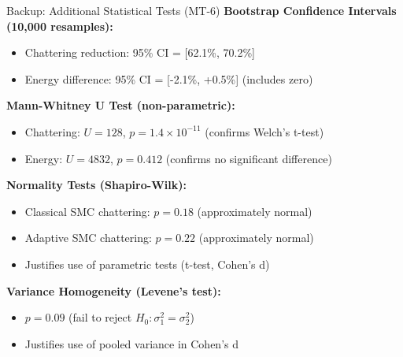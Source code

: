 \documentclass[10pt,aspectratio=169]{beamer}
\begin{document}
\begin{frame}{Backup: Additional Statistical Tests (MT-6)}
\textbf{Bootstrap Confidence Intervals (10,000 resamples):}
\begin{itemize}
    \item Chattering reduction: 95\% CI = [62.1\%, 70.2\%]
    \item Energy difference: 95\% CI = [-2.1\%, +0.5\%] (includes zero)
\end{itemize}

\vspace{0.3cm}
\textbf{Mann-Whitney U Test (non-parametric):}
\begin{itemize}
    \item Chattering: $U = 128$, $p = 1.4 \times 10^{-11}$ (confirms Welch's t-test)
    \item Energy: $U = 4832$, $p = 0.412$ (confirms no significant difference)
\end{itemize}

\vspace{0.3cm}
\textbf{Normality Tests (Shapiro-Wilk):}
\begin{itemize}
    \item Classical SMC chattering: $p = 0.18$ (approximately normal)
    \item Adaptive SMC chattering: $p = 0.22$ (approximately normal)
    \item Justifies use of parametric tests (t-test, Cohen's d)
\end{itemize}

\vspace{0.3cm}
\textbf{Variance Homogeneity (Levene's test):}
\begin{itemize}
    \item $p = 0.09$ (fail to reject $H_0: \sigma_1^2 = \sigma_2^2$)
    \item Justifies use of pooled variance in Cohen's d
\end{itemize}
\end{frame}
\end{document}
